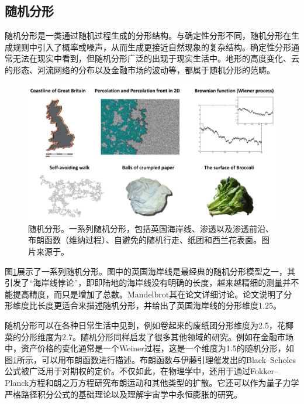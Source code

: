 \subsection{随机分形}
随机分形是一类通过随机过程生成的分形结构。与确定性分形不同，随机分形在生成规则中引入了概率或噪声，从而生成更接近自然现象的复杂结构。确定性分形通常无法在现实中看到，但随机分形广泛的出现于现实生活中。地形的高度变化、云的形态、河流网络的分布以及金融市场的波动等，都属于随机分形的范畴。

\begin{figure}[htbp]
    \centering
    \includegraphics[width=1\linewidth]{figure/FractalTopo/RandomFractal.jpg}
    \caption{随机分形。一系列随机分形，包括英国海岸线、渗透以及渗透前沿、布朗函数（维纳过程）、自避免的随机行走、纸团和西兰花表面。图片来源于\cite{wikipedia_hausdorff_fractals}。}
    \label{fig:RandomFractal}
\end{figure}

图\ref{fig:RandomFractal}展示了一系列随机分形。图中的英国海岸线是最经典的随机分形模型之一，其引发了“海岸线悖论”，即即陆地的海岸线没有明确的长度，越来越精细的测量并不能提高精度，而只是增加了总数。Mandelbrot其在论文\cite{mandelbrot1967coast}详细讨论。论文说明了分形维度比长度更适合来描述随机分形，并给出了英国海岸线的分形维度1.25。

随机分形可以在各种日常生活中见到，例如卷起来的废纸团分形维度为2.5，花椰菜的分形维度为2.7。随机分形同样启发了很多其他领域的研究。例如在金融市场中，资产价格的变化通常是一个Weiner过程，这是一个维度为1.5的随机分形，如图\ref{fig:RandomFractal}所示，可以用布朗函数进行描述。布朗函数与伊藤引理\cite{ito1951formula}催发出的Black–Scholes公式被广泛用于对期权的定价\cite{black1973pricing}。不仅如此，在物理学中，还用于通过Fokker–Planck方程\cite{van1992stochastic}和朗之万方程\cite{langevin1908theory}研究布朗运动和其他类型的扩散。它还可以作为量子力学严格路径积分公式的基础理论\cite{kac1949distributions}以及理解宇宙学中永恒膨胀的研究。

